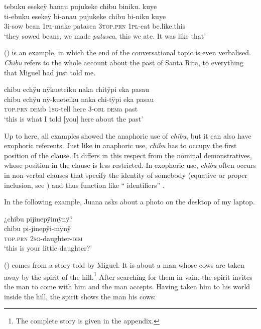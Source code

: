 \ea\label{ex:chibu-2}
\begingl
\glpreamble tebuku esekeÿ banau pujukeke chibu biniku. kuye\\
\gla ti-ebuku esekeÿ bi-anau pujukeke chibu bi-niku kuye\\
\glb 3i-sow bean 1\textsc{pl}-make patasca 3\textsc{top.prn} 1\textsc{pl}-eat be.like.this\\
\glft ‘they sowed beans, we made \textit{patasca}, this we ate. It was like that’
\endgl
\trailingcitation{[rxx-p181101l-2.202]}
\xe

() is an example, in which the end of the conversational topic is even verbalised. \textit{Chibu} refers to the whole account about the past of Santa Rita, to everything that Miguel had just told me.

\ea\label{ex:chibu-3}
\begingl
\glpreamble chibu echÿu nÿkueteiku naka chitÿpi eka pasau\\
\gla chibu echÿu nÿ-kueteiku naka chi-tÿpi eka pasau\\
\textsc{top.prn} \textsc{dem}b 1\textsc{sg}-tell here 3-\textsc{obl} \textsc{dem}a past\\
\glft ‘this is what I told [you] here about the past’
\endgl
\trailingcitation{[mxx-p110825l.142-145]}
\xe

Up to here, all examples showed the anaphoric use of \textit{chibu}, but it can also have exophoric referents. Just like in anaphoric use, \textit{chibu} has to occupy the first position of the clause. It differs in this respect from the nominal demonstratives, whose position in the clause is less restricted. In exophoric use, \textit{chibu} often occurs in non-verbal clauses that specify the identity of somebody (equative or proper inclusion, see ) and thus function like “ identifiers” \citep[79]{Diessel1999}.


In the following example, Juana asks about a photo on the desktop of my laptop.

\ea\label{ex:chibu-4}
\begingl
\glpreamble ¿chibu pijinepÿimÿnÿ?\\
\gla chibu pi-jinepÿi-mÿnÿ\\
\textsc{top.prn} 2\textsc{sg}-daughter-\textsc{dim}\\
\glft ‘this is your little daughter?’
\endgl
\trailingcitation{[jxx-e120430l-3a]}%
\xe


() comes from a story told by Miguel. It is about a man whose cows are taken away by the spirit of the hill.\footnote{The complete story is given in the appendix.} After searching for them in vain, the spirit invites the man to come with him and the man accepts. Having taken him to his world inside the hill, the spirit shows the man his cows:

